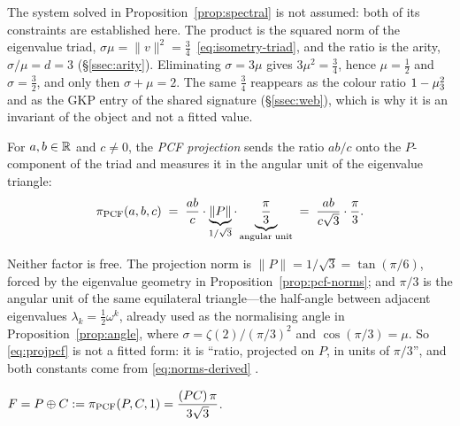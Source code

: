 \begin{remark}\label{rmk:spectral-origin}
The system solved in Proposition~\ref{prop:spectral} is not assumed: both of its constraints are
established here. The product is the squared norm of the eigenvalue triad,
$\sigma\mu=\lVert v\rVert^{2}=\tfrac34$~\eqref{eq:isometry-triad}, and the ratio is the arity,
$\sigma/\mu=d=3$ (\S\ref{ssec:arity}). Eliminating $\sigma=3\mu$ gives $3\mu^{2}=\tfrac34$, hence
$\mu=\tfrac12$ and $\sigma=\tfrac32$, and only then $\sigma+\mu=2$. The same $\tfrac34$ reappears
as the colour ratio $1-\mu_{3}^{2}$ and as the GKP entry of the shared signature
(\S\ref{ssec:web}), which is why it is an invariant of the object and not a fitted value.

\end{remark}

\begin{definition}\label{def:projpcf}
For $a,b\in\mathbb{R}$ and $c\neq0$, the \emph{PCF projection} sends the ratio $ab/c$ onto the
$P$-component of the triad and measures it in the angular unit of the eigenvalue triangle:
\begin{equation}\label{eq:projpcf}
  \pi_{\mathrm{PCF}}(a,b,c)\;=\;\frac{ab}{c}\cdot\underbrace{\lVert P\rVert}_{1/\sqrt3}
  \cdot\underbrace{\frac{\pi}{3}}_{\text{angular unit}}
  \;=\;\frac{ab}{c\sqrt3}\cdot\frac{\pi}{3}.
\end{equation}
\end{definition}

\begin{remark}\label{rmk:projpcf-constants}
Neither factor is free. The projection norm is $\lVert P\rVert=1/\sqrt3=\tan(\pi/6)$, forced by the
eigenvalue geometry in Proposition~\ref{prop:pcf-norms}; and $\pi/3$ is the angular unit of the
same equilateral triangle---the half-angle between adjacent eigenvalues $\lambda_k=\tfrac12\omega^k$,
already used as the normalising angle in Proposition~\ref{prop:angle}, where
$\sigma=\zeta(2)/(\pi/3)^2$ and $\cos(\pi/3)=\mu$. So \eqref{eq:projpcf} is not a fitted form: it is
``ratio, projected on $P$, in units of $\pi/3$'', and both constants come from
\eqref{eq:norms-derived} .
\end{remark}

\begin{proposition}\label{prop:oplus}
$F=P\oplus C:=\pi_{\mathrm{PCF}}(P,C,1)=\dfrac{(PC)\,\pi}{3\sqrt3}$.
\end{proposition}

